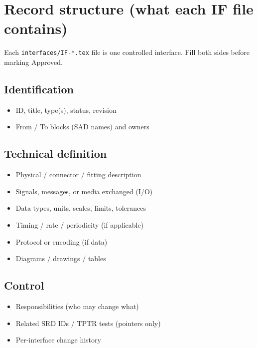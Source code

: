 \section{Record structure (what each IF file contains)}
\label{sec:icd-record-guide}

Each \texttt{interfaces/IF-*.tex} file is one controlled interface. Fill both
sides before marking Approved.

\subsection{Identification}

\begin{itemize}
  \item ID, title, type(s), status, revision
  \item From / To blocks (SAD names) and owners
\end{itemize}

\subsection{Technical definition}

\begin{itemize}
  \item Physical / connector / fitting description
  \item Signals, messages, or media exchanged (I/O)
  \item Data types, units, scales, limits, tolerances
  \item Timing / rate / periodicity (if applicable)
  \item Protocol or encoding (if data)
  \item Diagrams / drawings / tables
\end{itemize}

\subsection{Control}

\begin{itemize}
  \item Responsibilities (who may change what)
  \item Related SRD IDs / TPTR tests (pointers only)
  \item Per-interface change history
\end{itemize}


